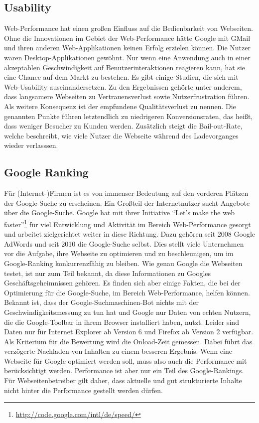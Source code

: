 \subsection{Usability}
Web-Performance hat einen großen Einfluss auf die Bedienbarkeit von Webseiten. Ohne die Innovationen im Gebiet der Web-Performance hätte Google mit GMail und ihren anderen Web-Applikationen keinen Erfolg erzielen können. Die Nutzer waren Desktop-Applikationen gew\"ohnt. Nur wenn eine Anwendung auch in einer akzeptablen Geschwindigkeit auf Benutzerinteraktionen reagieren kann, hat sie eine Chance auf dem Markt zu bestehen. Es gibt einige Studien, die sich mit Web-Usability auseinandersetzen. Zu den Ergebnissen gehörte unter anderem, dass langsamere Webseiten zu Vertrauensverlust sowie Nutzerfrustration führen. Als weitere Konsequenz ist der empfundene Qualitätsverlust zu nennen. Die genannten Punkte führen letztendlich zu niedrigeren Konversionsraten, das heißt, dass weniger Besucher zu Kunden werden. Zus\"atzlich steigt die Bail-out-Rate, welche beschreibt, wie viele Nutzer die Webseite w\"ahrend des Ladevorganges wieder verlasssen.\citep{Toll2011}

\subsection{Google Ranking}
Für (Internet-)Firmen ist es von immenser Bedeutung auf den vorderen Pl\"atzen der Google-Suche zu erscheinen. Ein Großteil der Internetnutzer sucht Angebote über die Google-Suche.\citep{Hitwise2011}
Google hat mit ihrer Initiative "`Let's make the web faster"'\footnote{\url{http://code.google.com/intl/de/speed/}} für viel Entwicklung und Aktivität im Bereich Web-Performance gesorgt und arbeitet zielgerichtet weiter in diese Richtung.\citep{Google2011} Dazu gehören seit 2008 Google AdWords\citep{AdWords2008} und seit 2010 die Google-Suche selbst. Dies stellt viele Unternehmen vor die Aufgabe, ihre Webseite zu optimieren und zu beschleunigen, um im Google-Ranking konkurrenzfähig zu bleiben. Wie genau Google die Webseiten testet, ist nur zum Teil bekannt, da diese Informationen zu Googles Geschäftsgeheimnissen gehören. Es finden sich aber einige Fakten, die bei der Optimierung für die Google-Suche, im Bereich Web-Performance, helfen können.
Bekannt ist, dass der Google-Suchmaschinen-Bot nichts mit der Geschwindigkeitsmessung zu tun hat und Google nur Daten von echten Nutzern, die die Google-Toolbar in ihrem Browser installiert haben, nutzt. Leider sind Daten nur für Internet Explorer ab Version 6 und Firefox ab Version 2 verfügbar. Als Kriterium für die Bewertung wird die Onload-Zeit gemessen. Dabei führt das verzögerte Nachladen von Inhalten zu einem besseren Ergebnis. Wenn eine Webseite für Google optimiert werden soll, muss also auch die Performance mit berücksichtigt werden. Performance ist aber nur ein Teil des Google-Rankings. Für Webseitenbetreiber gilt daher, dass aktuelle und gut strukturierte Inhalte nicht hinter die Performance gestellt werden dürfen.\citep{Bixby2011}

